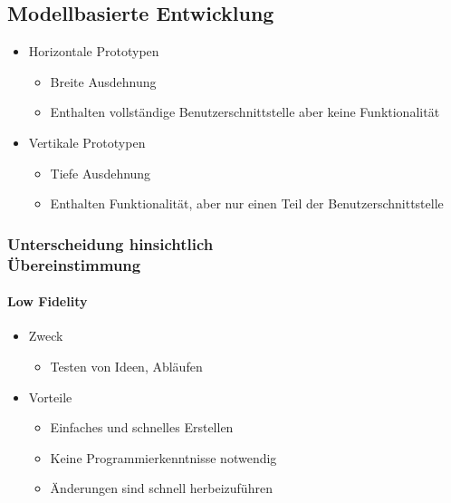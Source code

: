 \documentclass
[
	8pt,		%
	ngerman,	%
	a4paper,	%
	landscape,	%
	final		%
]{extarticle}
\begin{document}
\begin{multicols*}{4}
	\subsection{Modellbasierte Entwicklung}
	\begin{itemize}
		\item Horizontale Prototypen
		      \begin{itemize}[nolistsep]
			      \item Breite Ausdehnung
			      \item Enthalten vollständige Benutzerschnittstelle aber keine
			            Funktionalität
		      \end{itemize}
		\item Vertikale Prototypen
		      \begin{itemize}[nolistsep]
			      \item Tiefe Ausdehnung
			      \item Enthalten Funktionalität, aber nur einen Teil der
			            Benutzerschnittstelle
		      \end{itemize}
	\end{itemize}
	\subsubsection{Unterscheidung hinsichtlich\\Übereinstimmung}
	{
		\setlength{\columnseprule}{0pt}
		\begin{multicols*}{2}
			\paragraph{Low Fidelity}
			\begin{itemize}
				\item Zweck
				      \begin{itemize}[leftmargin=4pt,nolistsep]
					      \item Testen von Ideen, Abläufen
				      \end{itemize}
				\item Vorteile
				      \begin{itemize}[leftmargin=4pt,nolistsep]
					      \item Einfaches und schnelles Erstellen
					      \item Keine Programmierkenntnisse notwendig
					      \item Änderungen sind schnell herbeizuführen
				      \end{itemize}
			\end{itemize}
			\columnbreak

\end{multicols*}}
\end{multicols*}
\end{document}
